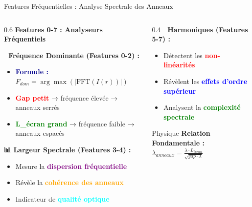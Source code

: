 \documentclass[aspectratio=169]{beamer}
\begin{document}
\begin{frame}{Features Fréquentielles : Analyse Spectrale des Anneaux}
    \begin{columns}
        \begin{column}{0.6\textwidth}
            \textbf{Features 0-7 : Analyseurs Fréquentiels}

            \vspace{0.3cm}
            \textbf{🌊 Fréquence Dominante (Features 0-2) :}
            \begin{itemize}
                \item \textcolor{darkblue}{\textbf{Formule :}} $F_{dom} = \arg\max(|\text{FFT}(I(r))|)$
                \item \textcolor{red}{\textbf{Gap petit}} → fréquence élevée → anneaux serrés
                \item \textcolor{green}{\textbf{L\_écran grand}} → fréquence faible → anneaux espacés
            \end{itemize}

            \vspace{0.3cm}
            \textbf{📊 Largeur Spectrale (Features 3-4) :}
            \begin{itemize}
                \item Mesure la \textcolor{purple}{\textbf{dispersion fréquentielle}}
                \item Révèle la \textcolor{orange}{\textbf{cohérence des anneaux}}
                \item Indicateur de \textcolor{cyan}{\textbf{qualité optique}}
            \end{itemize}
        \end{column}
        \begin{column}{0.4\textwidth}
            \textbf{🎼 Harmoniques (Features 5-7) :}
            \begin{itemize}
                \item Détectent les \textcolor{red}{\textbf{non-linéarités}}
                \item Révèlent les \textcolor{blue}{\textbf{effets d'ordre supérieur}}
                \item Analysent la \textcolor{green}{\textbf{complexité spectrale}}
            \end{itemize}

            \vspace{0.5cm}
            \begin{alertblock}{Physique}
                \textbf{Relation Fondamentale :} \\
                $\lambda_{anneaux} = \frac{\lambda \cdot L_{écran}}{\sqrt{gap \cdot \lambda}}$
            \end{alertblock}
        \end{column}
    \end{columns}
\end{frame}
\end{document}

